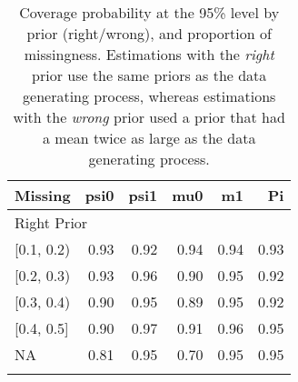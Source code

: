 \begin{table}[ht]
\centering
\begin{tabular}{lrrrrr}
  \toprule
Missing & psi0 & psi1 & mu0 & m1 & Pi \\ 
  \midrule
\multicolumn{6}{l}{Right Prior}\\
{[0.1, 0.2)} & 0.93 & 0.92 & 0.94 & 0.94 & 0.93 \\ 
  {[0.2, 0.3)} & 0.93 & 0.96 & 0.90 & 0.95 & 0.92 \\ 
  {[0.3, 0.4)} & 0.90 & 0.95 & 0.89 & 0.95 & 0.92 \\ 
  {[0.4, 0.5]} & 0.90 & 0.97 & 0.91 & 0.96 & 0.95 \\ 
  {NA} & 0.81 & 0.95 & 0.70 & 0.95 & 0.95 \\ 
   \bottomrule
\multicolumn{6}{l}{}\\
\end{tabular}
\caption{Coverage probability at the 95\% level by prior (right/wrong), and proportion of missingness. Estimations with the \emph{right} prior use the same priors as the data generating process, whereas estimations with the \emph{wrong} prior used a prior that had a mean twice as large as the data generating process.} 
\label{tab:coverage95-method-missigness}
\end{table}
